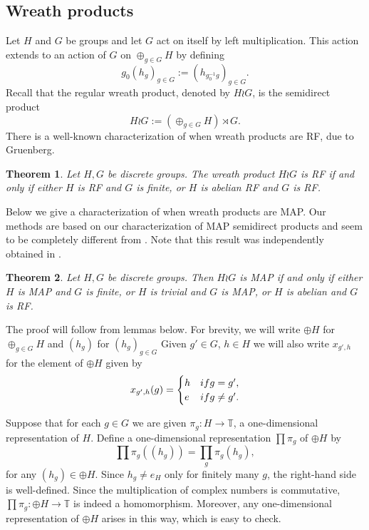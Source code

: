 \documentclass[11 pt, leqno, hidelinks]{amsart}%
\newtheorem{theorem}{Theorem}[section]
\theoremstyle{plain}
\numberwithin{equation}{section}
\begin{document}
\bigskip

\subsection{Wreath products}
Let $H$ and $G$ be groups and let $G$  act on itself by left multiplication. This action extends to an action of $G$ on $\oplus_{g\in G} H$ by defining
$$g_0  \left(h_g\right)_{g\in G} := \left(h_{g_0^{-1}g}\right)_{g\in G}.$$
Recall that the regular wreath product, denoted by $H \wr G$, is the semidirect product
$$H \wr G:= \left(\oplus_{g\in G} H\right) \rtimes G.$$
There is a well-known characterization of when wreath products are RF, due to Gruenberg.

\begin{theorem}\cite{Grunberg} Let $H,G$ be discrete groups. The wreath product $H \wr G$ is RF if and only if either $H$ is RF and $G$ is finite,  or $H$ is abelian RF and $G$ is RF.
\end{theorem}

Below we give a characterization of when wreath products are MAP. Our methods are based on our characterization of MAP semidirect products and seem to be completely different from  \cite{Grunberg}. Note that this result was independently obtained in \cite[Corollary G]{BekkaPreprint}.

\begin{theorem}\label{WreathMAP}Let $H,G$ be discrete groups. Then $H \wr G$ is MAP if and only if either $H$ is MAP and $G$ is finite, or $H$ is trivial and $G$ is MAP,   or $H$ is abelian and $G$ is RF.
\end{theorem}


The proof will follow from lemmas below. For brevity, we will write $\oplus H$   for  $\oplus_{g\in G} H$ and $(h_g)$  for $(h_g)_{g\in G}$ Given $g' \in G$, $h \in H$ we will also write $x_{g',h}$ for the element of $\oplus H$ given by  \[x_{g',h}(g) = \begin{cases}h & \textup{ if }  g=g', \\ e &  \textup{ if }  g\neq g'.\end{cases}\]

\medskip

Suppose that for each $g \in G$ we are given $\pi_g: H \to \mathbb T$, a one-dimensional representation of $H$. Define a one-dimensional representation $\prod\pi_g$ of $\oplus H$ by
$$\prod\pi_g((h_g)) = \prod_g \pi_g(h_g),$$
for any $ (h_g) \in \oplus H$. Since $ h_g\neq e_H$ only for finitely many $g$, the right-hand side is well-defined.
Since the multiplication of complex numbers is commutative, $\prod\pi_g: \oplus H \to \mathbb T$ is indeed a homomorphism. Moreover, any one-dimensional representation of $\oplus H$ arises in this way, which is easy to check.
\end{document}
